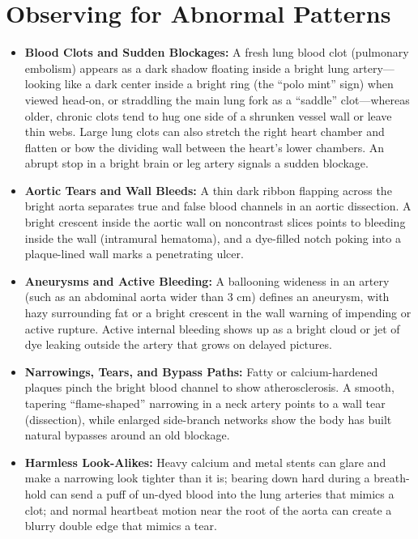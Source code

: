 \section{Observing for Abnormal Patterns}
\begin{itemize}
    \item \textbf{Blood Clots and Sudden Blockages:} A fresh lung blood clot (pulmonary embolism) appears as a dark shadow floating inside a bright lung artery---looking like a dark center inside a bright ring (the ``polo mint'' sign) when viewed head-on, or straddling the main lung fork as a ``saddle'' clot---whereas older, chronic clots tend to hug one side of a shrunken vessel wall or leave thin webs. Large lung clots can also stretch the right heart chamber and flatten or bow the dividing wall between the heart's lower chambers. An abrupt stop in a bright brain or leg artery signals a sudden blockage.
    \item \textbf{Aortic Tears and Wall Bleeds:} A thin dark ribbon flapping across the bright aorta separates true and false blood channels in an aortic dissection. A bright crescent inside the aortic wall on noncontrast slices points to bleeding inside the wall (intramural hematoma), and a dye-filled notch poking into a plaque-lined wall marks a penetrating ulcer.
    \item \textbf{Aneurysms and Active Bleeding:} A ballooning wideness in an artery (such as an abdominal aorta wider than 3 cm) defines an aneurysm, with hazy surrounding fat or a bright crescent in the wall warning of impending or active rupture. Active internal bleeding shows up as a bright cloud or jet of dye leaking outside the artery that grows on delayed pictures.
    \item \textbf{Narrowings, Tears, and Bypass Paths:} Fatty or calcium-hardened plaques pinch the bright blood channel to show atherosclerosis. A smooth, tapering ``flame-shaped'' narrowing in a neck artery points to a wall tear (dissection), while enlarged side-branch networks show the body has built natural bypasses around an old blockage.
    \item \textbf{Harmless Look-Alikes:} Heavy calcium and metal stents can glare and make a narrowing look tighter than it is; bearing down hard during a breath-hold can send a puff of un-dyed blood into the lung arteries that mimics a clot; and normal heartbeat motion near the root of the aorta can create a blurry double edge that mimics a tear.
\end{itemize}

